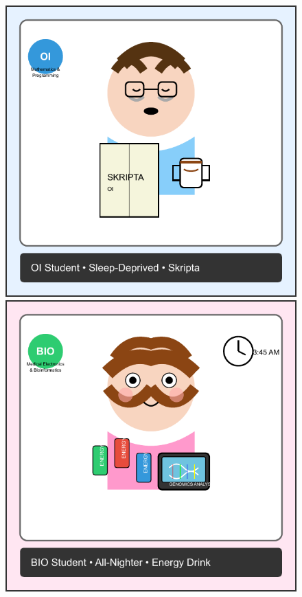 \documentclass[12pt]{article}
\begin{document}
\begin{figure}[h!]
  \centering
  \begin{minipage}{0.3\textwidth}
    \includegraphics[width=\textwidth]{NFTs/nft-sleep-deprived-io.pdf}
  \end{minipage}
  \hfill
  \begin{minipage}{0.3\textwidth}
    \includegraphics[width=\textwidth]{NFTs/nft-bio-pulling-allnighter.pdf}

\end{minipage}
\end{figure}
\end{document}
